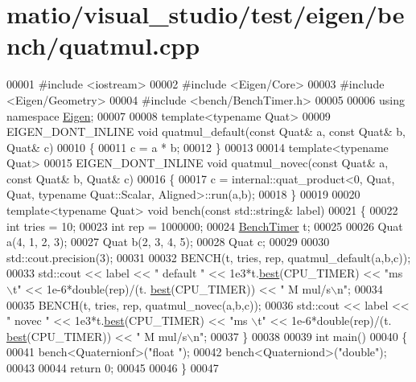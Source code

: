 \hypertarget{matio_2visual__studio_2test_2eigen_2bench_2quatmul_8cpp_source}{}\section{matio/visual\+\_\+studio/test/eigen/bench/quatmul.cpp}
\label{matio_2visual__studio_2test_2eigen_2bench_2quatmul_8cpp_source}

\begin{DoxyCode}
00001 \textcolor{preprocessor}{#include <iostream>}
00002 \textcolor{preprocessor}{#include <Eigen/Core>}
00003 \textcolor{preprocessor}{#include <Eigen/Geometry>}
00004 \textcolor{preprocessor}{#include <bench/BenchTimer.h>}
00005 
00006 \textcolor{keyword}{using namespace }\hyperlink{namespace_eigen}{Eigen}; 
00007 
00008 \textcolor{keyword}{template}<\textcolor{keyword}{typename} Quat>
00009 EIGEN\_DONT\_INLINE \textcolor{keywordtype}{void} quatmul\_default(\textcolor{keyword}{const} Quat& a, \textcolor{keyword}{const} Quat& b, Quat& c)
00010 \{
00011   c = a * b;
00012 \}
00013 
00014 \textcolor{keyword}{template}<\textcolor{keyword}{typename} Quat>
00015 EIGEN\_DONT\_INLINE \textcolor{keywordtype}{void} quatmul\_novec(\textcolor{keyword}{const} Quat& a, \textcolor{keyword}{const} Quat& b, Quat& c)
00016 \{
00017   c = internal::quat\_product<0, Quat, Quat, typename Quat::Scalar, Aligned>::run(a,b);
00018 \}
00019 
00020 \textcolor{keyword}{template}<\textcolor{keyword}{typename} Quat> \textcolor{keywordtype}{void} bench(\textcolor{keyword}{const} std::string& label)
00021 \{
00022   \textcolor{keywordtype}{int} tries = 10;
00023   \textcolor{keywordtype}{int} rep = 1000000;
00024   \hyperlink{class_eigen_1_1_bench_timer}{BenchTimer} t;
00025   
00026   Quat a(4, 1, 2, 3);
00027   Quat b(2, 3, 4, 5);
00028   Quat c;
00029   
00030   std::cout.precision(3);
00031   
00032   BENCH(t, tries, rep, quatmul\_default(a,b,c));
00033   std::cout << label << \textcolor{stringliteral}{" default "} << 1e3*t.\hyperlink{class_eigen_1_1_bench_timer_ae8b673b0fa356d3432c7a65c79e8af0e}{best}(CPU\_TIMER) << \textcolor{stringliteral}{"ms  \(\backslash\)t"} << 1e-6*double(rep)/(t.
      \hyperlink{class_eigen_1_1_bench_timer_ae8b673b0fa356d3432c7a65c79e8af0e}{best}(CPU\_TIMER)) << \textcolor{stringliteral}{" M mul/s\(\backslash\)n"};
00034   
00035   BENCH(t, tries, rep, quatmul\_novec(a,b,c));
00036   std::cout << label << \textcolor{stringliteral}{" novec   "} << 1e3*t.\hyperlink{class_eigen_1_1_bench_timer_ae8b673b0fa356d3432c7a65c79e8af0e}{best}(CPU\_TIMER) << \textcolor{stringliteral}{"ms  \(\backslash\)t"} << 1e-6*double(rep)/(t.
      \hyperlink{class_eigen_1_1_bench_timer_ae8b673b0fa356d3432c7a65c79e8af0e}{best}(CPU\_TIMER)) << \textcolor{stringliteral}{" M mul/s\(\backslash\)n"};
00037 \}
00038 
00039 \textcolor{keywordtype}{int} main()
00040 \{
00041   bench<Quaternionf>(\textcolor{stringliteral}{"float "});
00042   bench<Quaterniond>(\textcolor{stringliteral}{"double"});
00043 
00044   \textcolor{keywordflow}{return} 0;
00045 
00046 \}
00047 
\end{DoxyCode}

